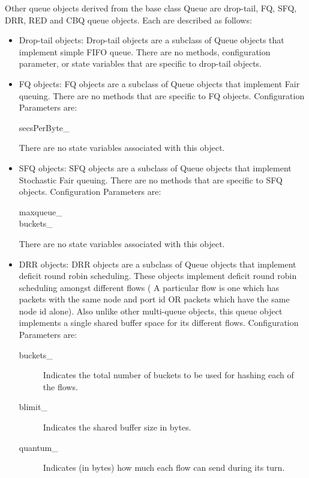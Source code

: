 Other queue objects derived from the base class Queue are drop-tail, FQ,
SFQ, DRR, RED and CBQ queue objects. Each are described as follows:
\begin{itemize}

\item Drop-tail objects:
Drop-tail objects are a subclass of Queue objects that implement simple
FIFO queue. There are no methods, configuration parameter, or state
variables that are specific to drop-tail objects. 

\item FQ objects:
FQ objects are a subclass of Queue objects that implement Fair queuing.
There are no methods that are specific to FQ objects. 
Configuration Parameters are:
\begin{description}
\item[secsPerByte\_] 
\end{description}
There are no state variables associated with this object. 

\item SFQ objects:
SFQ objects are a subclass of Queue objects that implement Stochastic Fair
queuing. There are no methods that are specific to SFQ objects. 
Configuration Parameters are:
\begin{description}
\item[maxqueue\_]

\item[buckets\_]
\end{description}
There are no state variables associated with this object. 

\item DRR objects:
DRR objects are a subclass of Queue objects that implement deficit round
robin scheduling. These objects implement deficit round robin scheduling
amongst different flows ( A particular flow is one which has packets with
the same node and port id OR packets which have the same node id alone).
Also unlike other multi-queue objects, this queue object implements a
single shared buffer space for its different flows. Configuration
Parameters are:
\begin{description}
\item[buckets\_] Indicates the total number of buckets to be used for
hashing each of the flows. 

\item[blimit\_] Indicates the shared buffer size in bytes. 

\item[quantum\_] Indicates (in bytes) how much each flow can send during
its turn. 


\end{description}
\end{itemize}
